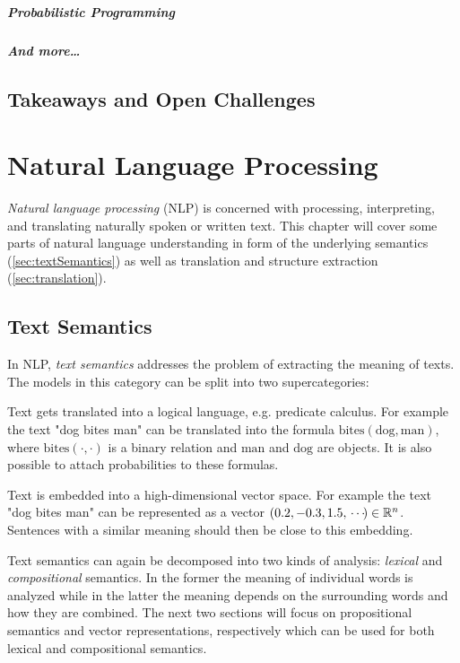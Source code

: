 		\paragraph{Probabilistic Programming} %

		\paragraph{And more\dots} %

	\section{Takeaways and Open Challenges} %

\chapter{Natural Language Processing}
	\emph{Natural language processing} (NLP) is concerned with processing, interpreting, and translating naturally spoken or written text. This chapter will cover some parts of natural language understanding in form of the underlying semantics (\autoref{sec:textSemantics}) as well as translation and structure extraction (\autoref{sec:translation}).

	\section{Text Semantics}
		\label{sec:textSemantics}

		In NLP, \emph{text semantics} addresses the problem of extracting the meaning of texts. The models in this category can be split into two supercategories:
		\begin{description}[leftmargin = 5cm]
			\item[Propositional Semantics]
				Text gets translated into a logical language, e.g. predicate calculus. For example the text "dog bites man" can be translated into the formula \( \mathrm{bites}(\mathrm{dog}, \mathrm{man}) \), where \( \mathrm{bites}(\cdot, \cdot) \) is a binary relation and \(\mathrm{man}\) and \(\mathrm{dog}\) are objects. It is also possible to attach probabilities to these formulas.
			\item[Vector Representation]
				Text is embedded into a high-dimensional vector space. For example the text "dog bites man" can be represented as a vector \( (0.2, -0.3, 1.5, \,\cdots\!) \in \mathbb{R}^n \). Sentences with a similar meaning should then be close to this embedding.
		\end{description}
		Text semantics can again be decomposed into two kinds of analysis: \emph{lexical} and \emph{compositional} semantics. In the former the meaning of individual words is analyzed while in the latter the meaning depends on the surrounding words and how they are combined. The next two sections will focus on propositional semantics and vector representations, respectively which can be used for both lexical and compositional semantics.

